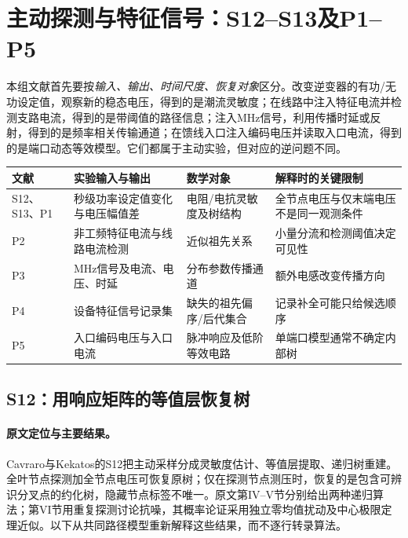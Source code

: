 \documentclass[UTF8,11pt,fontset=fandol]{ctexart}
\theoremstyle{remark}
\numberwithin{equation}{section}
\begin{document}

\clearpage

\section{主动探测与特征信号：S12--S13及P1--P5}
\label{sec:probing-detailed}

本组文献首先要按\emph{输入、输出、时间尺度、恢复对象}区分。改变逆变器的有功/无功设定值，观察新的稳态电压，得到的是潮流灵敏度；在线路中注入特征电流并检测支路电流，得到的是带阈值的路径信息；注入MHz信号，利用传播时延或反射，得到的是频率相关传输通道；在馈线入口注入编码电压并读取入口电流，得到的是端口动态等效模型。它们都属于主动实验，但对应的逆问题不同。

\begin{center}
\small
\begin{tabularx}{\textwidth}{@{}lXXX@{}}
\toprule
文献 & 实验输入与输出 & 数学对象 & 解释时的关键限制\\
\midrule
S12、S13、P1 & 秒级功率设定值变化与电压幅值差 & 电阻/电抗灵敏度及树结构 & 全节点电压与仅末端电压不是同一观测条件\\
P2 & 非工频特征电流与线路电流检测 & 近似祖先关系 & 小量分流和检测阈值决定可见性\\
P3 & MHz信号及电流、电压、时延 & 分布参数传播通道 & 额外电感改变传播方向\\
P4 & 设备特征信号记录集 & 缺失的祖先偏序/后代集合 & 记录补全可能只给候选顺序\\
P5 & 入口编码电压与入口电流 & 脉冲响应及低阶等效电路 & 单端口模型通常不确定内部树\\
\bottomrule
\end{tabularx}
\end{center}

\subsection{S12：用响应矩阵的等值层恢复树}
\label{subsec:S12}

\paragraph{原文定位与主要结果。}
Cavraro与Kekatos的S12\citep{S12}把主动采样分成灵敏度估计、等值层提取、递归树重建。全叶节点探测加全节点电压可恢复原树；仅在探测节点测压时，恢复的是包含可辨识分叉点的约化树，隐藏节点标签不唯一。原文第IV--V节分别给出两种递归算法；第VI节用重复探测讨论抗噪，其概率论证采用独立零均值扰动及中心极限定理近似。以下从共同路径模型重新解释这些结果，而不逐行转录算法。
\end{document}
